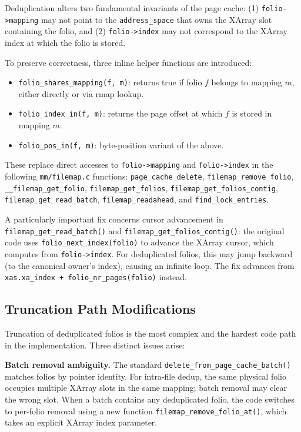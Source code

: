 \documentclass[conference]{IEEEtran}
\begin{document}
Deduplication alters two fundamental invariants of the page cache: (1) \texttt{folio->mapping} may not point to the \texttt{address\_space} that owns the XArray slot containing the folio, and (2) \texttt{folio->index} may not correspond to the XArray index at which the folio is stored.

To preserve correctness, three inline helper functions are introduced:

\begin{itemize}
    \item \texttt{folio\_shares\_mapping(f, m)}: returns true if folio $f$ belongs to mapping $m$, either directly or via rmap lookup.
    \item \texttt{folio\_index\_in(f, m)}: returns the page offset at which $f$ is stored in mapping $m$.
    \item \texttt{folio\_pos\_in(f, m)}: byte-position variant of the above.
\end{itemize}

These replace direct accesses to \texttt{folio->mapping} and \texttt{folio->index} in the following \texttt{mm/filemap.c} functions: \texttt{page\_cache\_delete}, \texttt{filemap\_remove\_folio}, \texttt{\_\_filemap\_get\_folio}, \texttt{filemap\_get\_folios}, \texttt{filemap\_get\_folios\_contig}, \texttt{filemap\_get\_read\_batch}, \texttt{filemap\_readahead}, and \texttt{find\_lock\_entries}.

A particularly important fix concerns cursor advancement in \texttt{filemap\_get\_read\_batch()} and \texttt{filemap\_get\_folios\_contig()}: the original code uses \texttt{folio\_next\_index(folio)} to advance the XArray cursor, which computes from \texttt{folio->index}. For deduplicated folios, this may jump backward (to the canonical owner's index), causing an infinite loop. The fix advances from \texttt{xas.xa\_index + folio\_nr\_pages(folio)} instead.

\subsection{Truncation Path Modifications}

Truncation of deduplicated folios is the most complex and the hardest code path in the implementation. Three distinct issues arise:

\textbf{Batch removal ambiguity.} The standard \texttt{delete\_from\_page\_cache\_batch()} matches folios by pointer identity. For intra-file dedup, the same physical folio occupies multiple XArray slots in the same mapping; batch removal may clear the wrong slot. When a batch contains any deduplicated folio, the code switches to per-folio removal using a new function \texttt{filemap\_remove\_folio\_at()}, which takes an explicit XArray index parameter.
\end{document}
